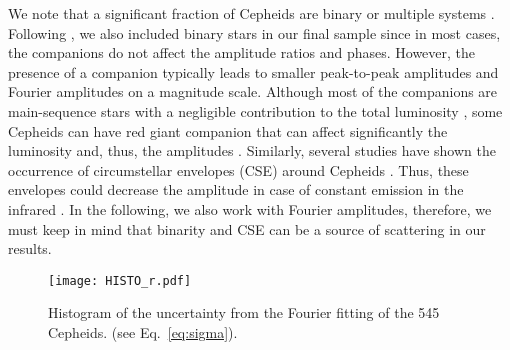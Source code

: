 \documentclass[article]{aa} %
\begin{document}
We note that a significant fraction of Cepheids are binary or multiple systems \citep{Szabados2003,Kervella2019}. Following \cite{Klagyivik2013}, we also included binary stars in our final sample since in most cases, the companions do not affect the amplitude ratios and phases. However, the presence of a companion typically leads to smaller peak-to-peak amplitudes and Fourier amplitudes on a magnitude scale. Although most of the companions are main-sequence stars with a negligible contribution to the total luminosity \citep{Kaczmarek2022}, some Cepheids can have red giant companion that can affect significantly the luminosity and, thus, the amplitudes \citep{Pilecki2021,Kaczmarek2022}. Similarly, several studies have shown the occurrence of circumstellar envelopes (CSE) around Cepheids \citep{kervella06a,merand06,gallenne13b,nardetto16,Gallenne2021}. Thus, these envelopes could decrease the amplitude in case of constant emission in the infrared \citep{Hocde2020a,Hocde2020b,Hocde2021,Kovtyukh2022He}. In the following, we also work with Fourier amplitudes, therefore, we must keep in mind that binarity and CSE can be a source of scattering in our results. 


\begin{figure}
\begin{center}
\texttt{[image: HISTO\_r.pdf]}
\caption{\small Histogram of the uncertainty from the Fourier fitting of the 545 Cepheids. (see Eq.~\ref{eq:sigma}).} \label{fig:quality_fit}
\end{center}
\end{figure}
\end{document}
